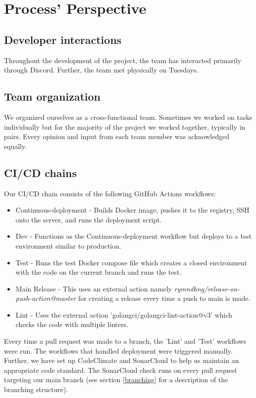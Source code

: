 \section{Process' Perspective}

\subsection{Developer interactions}
Throughout the development of the project, the team has interacted primarily through Discord. Further, the team met physically on Tuesdays.

\subsection{Team organization}
We organized ourselves as a cross-functional team. Sometimes we worked on tasks individually but for the majority of the project we worked together, 
typically in pairs. Every opinion and input from each team member was acknowledged equally. 

\subsection{CI/CD chains}
Our CI/CD chain consists of the following GitHub Actions workflows:
\begin{itemize}
    \item Continuous-deployment - Builds Docker image, pushes it to the registry, SSH onto the server, and runs the deployment script.
    \item Dev - Functions as the Continuous-deployment workflow but deploys to a test environment similar to production.
    \item Test - Runs the test Docker compose file which creates a closed environment with the code on the current branch and runs the test.
    \item Main Release - This uses an external action namely \textit{rymndhng/release-on-push-action@master} for creating a release every time a push to main is made.
    \item Lint - Uses the external action 'golangci/golangci-lint-action@v3' which checks the code with multiple linters.
\end{itemize}

Every time a pull request was made to a branch, the 'Lint' and 'Test' workflows were run. The workflows that handled deployment were triggered manually.
Further, we have set up CodeClimate and SonarCloud to help us maintain an appropriate code standard. The SonarCloud check runs on every pull request targeting our main branch (see section \ref{branching} for a description of the 
branching structure).

